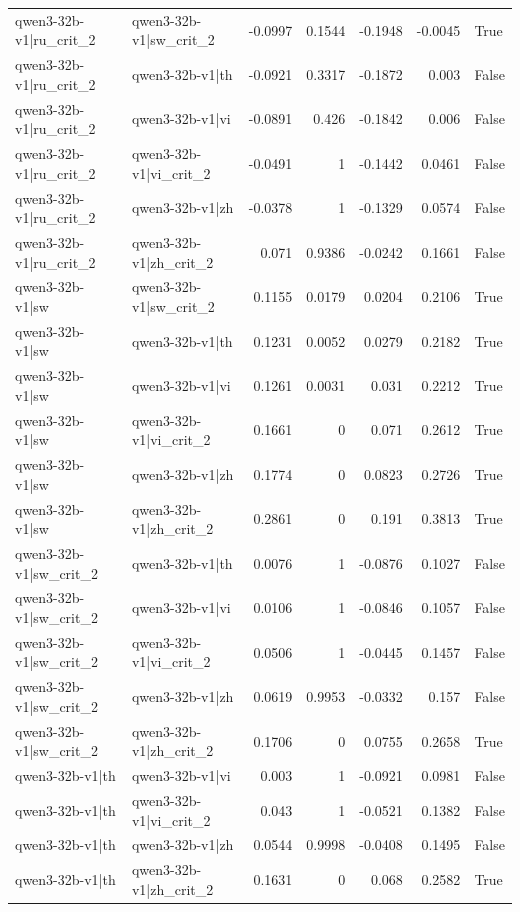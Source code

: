 \begin{table}
\begin{tabular}{l l r r r r l}
qwen3-32b-v1|ru_crit_2 & qwen3-32b-v1|sw_crit_2 & -0.0997 & 0.1544 & -0.1948 & -0.0045 & True \\
qwen3-32b-v1|ru_crit_2 & qwen3-32b-v1|th & -0.0921 & 0.3317 & -0.1872 & 0.003 & False \\
qwen3-32b-v1|ru_crit_2 & qwen3-32b-v1|vi & -0.0891 & 0.426 & -0.1842 & 0.006 & False \\
qwen3-32b-v1|ru_crit_2 & qwen3-32b-v1|vi_crit_2 & -0.0491 & 1 & -0.1442 & 0.0461 & False \\
qwen3-32b-v1|ru_crit_2 & qwen3-32b-v1|zh & -0.0378 & 1 & -0.1329 & 0.0574 & False \\
qwen3-32b-v1|ru_crit_2 & qwen3-32b-v1|zh_crit_2 & 0.071 & 0.9386 & -0.0242 & 0.1661 & False \\
qwen3-32b-v1|sw & qwen3-32b-v1|sw_crit_2 & 0.1155 & 0.0179 & 0.0204 & 0.2106 & True \\
qwen3-32b-v1|sw & qwen3-32b-v1|th & 0.1231 & 0.0052 & 0.0279 & 0.2182 & True \\
qwen3-32b-v1|sw & qwen3-32b-v1|vi & 0.1261 & 0.0031 & 0.031 & 0.2212 & True \\
qwen3-32b-v1|sw & qwen3-32b-v1|vi_crit_2 & 0.1661 & 0 & 0.071 & 0.2612 & True \\
qwen3-32b-v1|sw & qwen3-32b-v1|zh & 0.1774 & 0 & 0.0823 & 0.2726 & True \\
qwen3-32b-v1|sw & qwen3-32b-v1|zh_crit_2 & 0.2861 & 0 & 0.191 & 0.3813 & True \\
qwen3-32b-v1|sw_crit_2 & qwen3-32b-v1|th & 0.0076 & 1 & -0.0876 & 0.1027 & False \\
qwen3-32b-v1|sw_crit_2 & qwen3-32b-v1|vi & 0.0106 & 1 & -0.0846 & 0.1057 & False \\
qwen3-32b-v1|sw_crit_2 & qwen3-32b-v1|vi_crit_2 & 0.0506 & 1 & -0.0445 & 0.1457 & False \\
qwen3-32b-v1|sw_crit_2 & qwen3-32b-v1|zh & 0.0619 & 0.9953 & -0.0332 & 0.157 & False \\
qwen3-32b-v1|sw_crit_2 & qwen3-32b-v1|zh_crit_2 & 0.1706 & 0 & 0.0755 & 0.2658 & True \\
qwen3-32b-v1|th & qwen3-32b-v1|vi & 0.003 & 1 & -0.0921 & 0.0981 & False \\
qwen3-32b-v1|th & qwen3-32b-v1|vi_crit_2 & 0.043 & 1 & -0.0521 & 0.1382 & False \\
qwen3-32b-v1|th & qwen3-32b-v1|zh & 0.0544 & 0.9998 & -0.0408 & 0.1495 & False \\
qwen3-32b-v1|th & qwen3-32b-v1|zh_crit_2 & 0.1631 & 0 & 0.068 & 0.2582 & True \\

\end{tabular}
\end{table}
